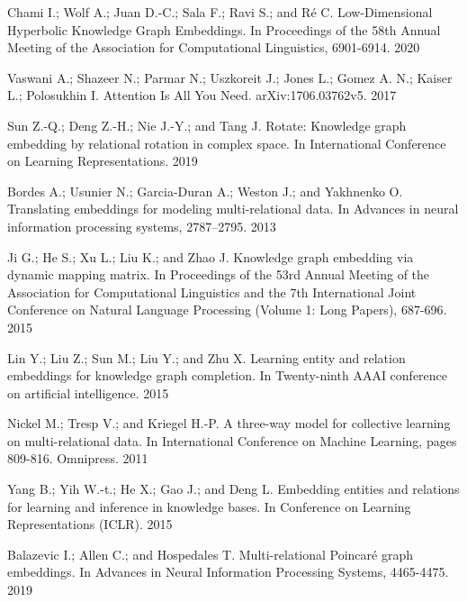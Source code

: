 \documentclass[9pt]{ctexart}
\theoremstyle{definition}
\begin{document}
\hypertarget{Cha20}{Chami I.; Wolf A.; Juan D.-C.; Sala F.; Ravi S.; and Ré C. Low-Dimensional Hyperbolic Knowledge Graph Embeddings. In Proceedings of the 58th Annual Meeting of the Association for Computational Linguistics, 6901-6914. 2020}

\hypertarget{Vas17}{Vaswani A.; Shazeer N.; Parmar N.; Uszkoreit J.; Jones L.; Gomez A. N.; Kaiser L.; Polosukhin I. Attention Is All You Need. arXiv:1706.03762v5. 2017}

\hypertarget{Sun19}{Sun Z.-Q.; Deng Z.-H.; Nie J.-Y.; and Tang J. Rotate: Knowledge graph embedding by relational rotation in complex space. In International Conference on Learning Representations. 2019}

\hypertarget{Bor13}{Bordes A.; Usunier N.; Garcia-Duran A.; Weston J.; and Yakhnenko O. Translating embeddings for modeling multi-relational data. In Advances in neural information processing systems, 2787–2795. 2013}

\hypertarget{Jie15}{Ji G.; He S.; Xu L.; Liu K.; and Zhao J. Knowledge graph embedding via dynamic mapping matrix. In Proceedings of the 53rd Annual Meeting of the Association for Computational Linguistics and the 7th International Joint Conference on Natural Language Processing (Volume 1: Long Papers), 687-696. 2015}

\hypertarget{Lin15}{Lin Y.; Liu Z.; Sun M.; Liu Y.; and Zhu X. Learning entity and relation embeddings for knowledge graph completion. In Twenty-ninth AAAI conference on artificial intelligence. 2015}

\hypertarget{Nic11}{Nickel M.; Tresp V.; and Kriegel H.-P. A three-way model for collective learning on multi-relational data. In International Conference on Machine Learning, pages 809-816. Omnipress. 2011}

\hypertarget{Yan15}{Yang B.; Yih W.-t.; He X.; Gao J.; and Deng L. Embedding entities and relations for learning and inference in knowledge bases. In Conference on Learning Representations (ICLR). 2015}

\hypertarget{Bal19}{Balazevic I.; Allen C.; and Hospedales T. Multi-relational Poincaré graph embeddings. In Advances in Neural Information Processing Systems, 4465-4475. 2019}
\end{document}
